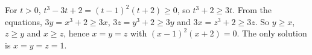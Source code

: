 For $t>0$, $t^3-3t+2=(t-1)^2(t+2)\ge0$, so $t^3+2\ge3t$. From the equations, $3y=x^3+2\ge3x$, $3z=y^3+2\ge3y$ and $3x=z^3+2\ge3z$. So $y\ge x$, $z\ge y$ and $x\ge z$, hence $x=y=z$ with $(x-1)^2(x+2)=0$. The only solution is $\boxed{x=y=z=1}$.
